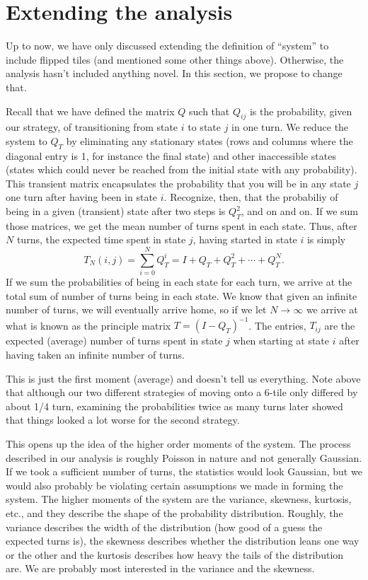 \documentclass[letterpaper,11pt]{article}
\begin{document}
\section{Extending the analysis}
Up to now, we have only discussed extending the definition of ``system'' to 
include flipped tiles (and mentioned some other things above).  Otherwise, the
analysis hasn't included anything novel.  In this section, we propose to change
that.  

Recall that we have defined the matrix $Q$ such that $Q_{ij}$ is the
probability, given our strategy, of transitioning from state $i$ to state $j$ in
one turn.  We reduce the system to $Q_T$ by eliminating any stationary states
(rows and columns where the diagonal entry is 1, for instance the final state)
and other inaccessible states (states which could never be reached from the
initial state with any probability).  This transient matrix encapsulates the 
probability that you will be in any state $j$ one turn after having been in 
state $i$.  Recognize, then, that the probabiliy of being in a given (transient)
state after two steps is $Q_T^2$, and on and on.  If we sum those matrices, we
get the mean number of turns spent in each state.  Thus, after $N$ turns, the
expected time spent in state $j$, having started in state $i$ is simply
\[
	T_N(i,j)=\sum_{i=0}^{N} Q_T^i=I+Q_T+Q_T^2+\cdots+Q_T^N.
\]
If we sum the probabilities of being  in each state for each turn, we arrive
at the total sum of number of turns being in each state.  We know that given an
infinite number of turns, we will eventually arrive home, so if we let $N
\rightarrow \infty$ we arrive at what is known as the principle matrix
$T=(I-Q_T)^{-1}$.  The entries, $T_{ij}$ are the expected (average) number
of turns spent in state $j$ when starting at state $i$ after having taken an
infinite number of turns.

This is just the first moment (average) and doesn't tell us everything.  Note
above that although our two different strategies of moving onto a 6-tile only
differed by about 1/4 turn, examining the probabilities twice as many turns 
later showed that things looked a lot worse for the second strategy.

This opens up the idea of the higher order moments of the system.  The process
described in our analysis is roughly Poisson in nature and not generally
Gaussian.  If we took a sufficient number of turns, the statistics would look
Gaussian, but we would also probably be violating certain assumptions we made in
forming the system.  The higher moments of the
system are the variance, skewness, kurtosis, etc., and they describe the shape
of the probability distribution.  Roughly, the variance describes the width
of the distribution (how good of a guess the expected turns is), the skewness
describes whether the distribution leans one way or the other and the kurtosis
describes how heavy the tails of the distribution are.  We are probably most
interested in the variance and the skewness.
\end{document}
